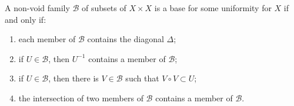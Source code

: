 A non-void family $\mathcal{B}$ of subsets of $X \times X$ is a base for some uniformity for $X$ if and only if:
\begin{enumerate}
\item[(a)] each member of $\mathcal{B}$ contains the diagonal $\Delta$;
\item[(b)] if $U \in \mathcal{B}$, then $U^{-1}$ contains a member of $\mathcal{B}$;
\item[(c)] if $U \in \mathcal{B}$, then there is $V \in \mathcal{B}$ such that $V \circ V \subset U$;
\item[(d)] the intersection of two members of $\mathcal{B}$ contains a member of $\mathcal{B}$.
\end{enumerate}
